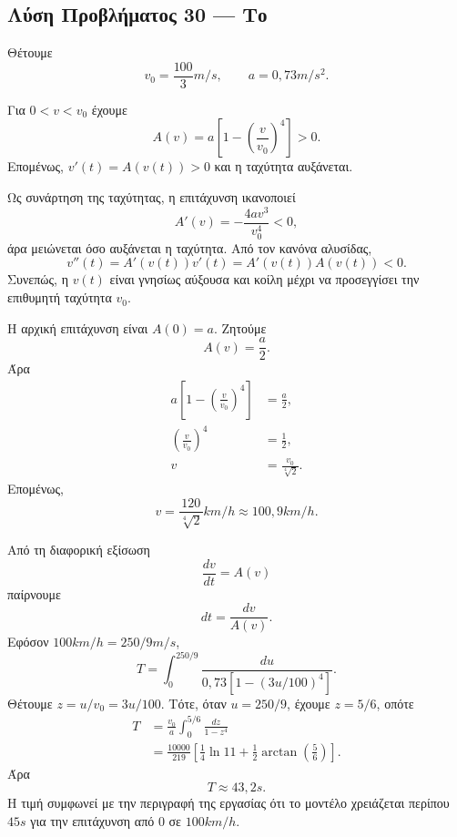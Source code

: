 \subsection*{Λύση Προβλήματος 30 --- Το }

Θέτουμε
\[
  v_0=\frac{100}{3}\si{m/s},
  \qquad
  a=0{,}73\si{m/s^2}.
\]

\begin{alist}
  \item Για $0<v<v_0$ έχουμε
        \[
          A(v)=a\left[1-\left(\frac{v}{v_0}\right)^4\right]>0.
        \]
        Επομένως, $v'(t)=A(v(t))>0$ και η ταχύτητα αυξάνεται.

        Ως συνάρτηση της ταχύτητας, η επιτάχυνση ικανοποιεί
        \[
          A'(v)=-\frac{4av^3}{v_0^4}<0,
        \]
        άρα μειώνεται όσο αυξάνεται η ταχύτητα. Από τον κανόνα
        αλυσίδας,
        \[
          v''(t)
          =A'(v(t))v'(t)
          =A'(v(t))A(v(t))<0.
        \]
        Συνεπώς, η $v(t)$ είναι γνησίως αύξουσα και κοίλη μέχρι να
        προσεγγίσει την επιθυμητή ταχύτητα $v_0$.

  \item Η αρχική επιτάχυνση είναι $A(0)=a$. Ζητούμε
        \[
          A(v)=\frac{a}{2}.
        \]
        Άρα
        \begin{align*}
          a\left[1-\left(\frac{v}{v_0}\right)^4\right]
          &=\frac{a}{2},\\
          \left(\frac{v}{v_0}\right)^4&=\frac12,\\
          v&=\frac{v_0}{\sqrt[4]{2}}.
        \end{align*}
        Επομένως,
        \[
          {
            v=\frac{120}{\sqrt[4]{2}}\si{km/h}
            \approx100{,}9\si{km/h}
          }.
        \]

  \item Από τη διαφορική εξίσωση
        \[
          \frac{dv}{dt}=A(v)
        \]
        παίρνουμε
        \[
          dt=\frac{dv}{A(v)}.
        \]
        Εφόσον $100\si{km/h}=250/9\si{m/s}$,
        \[
          T=\int_0^{250/9}
          \frac{du}{0{,}73\left[1-(3u/100)^4\right]}.
        \]
        Θέτουμε $z=u/v_0=3u/100$. Τότε, όταν $u=250/9$,
        έχουμε $z=5/6$, οπότε
        \begin{align*}
          T
          &=\frac{v_0}{a}\int_0^{5/6}\frac{dz}{1-z^4}\\
          &=\frac{10000}{219}
            \left[
              \frac14\ln 11
              +\frac12\arctan\left(\frac56\right)
            \right].
        \end{align*}
        Άρα
        \[
          {T\approx43{,}2\si{s}}.
        \]
        Η τιμή συμφωνεί με την περιγραφή της εργασίας ότι το μοντέλο
        χρειάζεται περίπου $45\si{s}$ για την επιτάχυνση από $0$ σε
        $100\si{km/h}$.


\end{alist}
